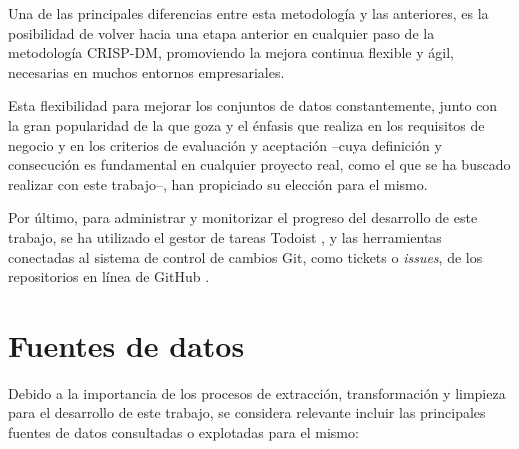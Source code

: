 Una de las principales diferencias entre esta metodología y las anteriores, es la posibilidad de volver hacia una etapa anterior en cualquier paso de la metodología CRISP-DM, promoviendo la mejora continua flexible y ágil, necesarias en muchos entornos empresariales.

Esta flexibilidad para mejorar los conjuntos de datos constantemente, junto con la gran popularidad de la que goza y el énfasis que realiza en los requisitos de negocio y en los criterios de evaluación y aceptación –cuya definición y consecución es fundamental en cualquier proyecto real, como el que se ha buscado realizar con este trabajo–, han propiciado su elección para el mismo.

Por último, para administrar y monitorizar el progreso del desarrollo de este trabajo, se ha utilizado el gestor de tareas Todoist \cite{todoist}, y las herramientas conectadas al sistema de control de cambios Git, como tickets o \textit{issues}, de los repositorios en línea de GitHub \cite{github}.

\section{Fuentes de datos}

Debido a la importancia de los procesos de extracción, transformación y limpieza para el desarrollo de este trabajo, se considera relevante incluir las principales fuentes de datos consultadas o explotadas para el mismo:

